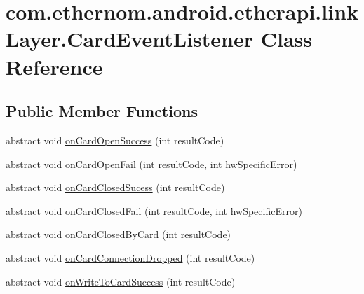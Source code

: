 \hypertarget{classcom_1_1ethernom_1_1android_1_1etherapi_1_1link_layer_1_1_card_event_listener}{}\section{com.\+ethernom.\+android.\+etherapi.\+link\+Layer.\+Card\+Event\+Listener Class Reference}
\label{classcom_1_1ethernom_1_1android_1_1etherapi_1_1link_layer_1_1_card_event_listener}
\subsection*{Public Member Functions}
\begin{DoxyCompactItemize}
\item 
abstract void \mbox{\hyperlink{classcom_1_1ethernom_1_1android_1_1etherapi_1_1link_layer_1_1_card_event_listener_ad9fe43a6673d7e2c8f7969129cb26afb}{on\+Card\+Open\+Success}} (int result\+Code)
\item 
abstract void \mbox{\hyperlink{classcom_1_1ethernom_1_1android_1_1etherapi_1_1link_layer_1_1_card_event_listener_a12bc0f6a876f07a7f7223e58bf783f01}{on\+Card\+Open\+Fail}} (int result\+Code, int hw\+Specific\+Error)
\item 
abstract void \mbox{\hyperlink{classcom_1_1ethernom_1_1android_1_1etherapi_1_1link_layer_1_1_card_event_listener_a5f86d70cadf3d2d652b67ca2128eeeda}{on\+Card\+Closed\+Sucess}} (int result\+Code)
\item 
abstract void \mbox{\hyperlink{classcom_1_1ethernom_1_1android_1_1etherapi_1_1link_layer_1_1_card_event_listener_a76ddf19df7063f490b94449ad8de2b2e}{on\+Card\+Closed\+Fail}} (int result\+Code, int hw\+Specific\+Error)
\item 
abstract void \mbox{\hyperlink{classcom_1_1ethernom_1_1android_1_1etherapi_1_1link_layer_1_1_card_event_listener_aba636a8cdbf15d8440b26c66b653b611}{on\+Card\+Closed\+By\+Card}} (int result\+Code)
\item 
abstract void \mbox{\hyperlink{classcom_1_1ethernom_1_1android_1_1etherapi_1_1link_layer_1_1_card_event_listener_aa1274186d93227cf6202d32bd6648a42}{on\+Card\+Connection\+Dropped}} (int result\+Code)
\item 
abstract void \mbox{\hyperlink{classcom_1_1ethernom_1_1android_1_1etherapi_1_1link_layer_1_1_card_event_listener_a25f22cba82893eb625006927a184fc20}{on\+Write\+To\+Card\+Success}} (int result\+Code)

\end{DoxyCompactItemize}
